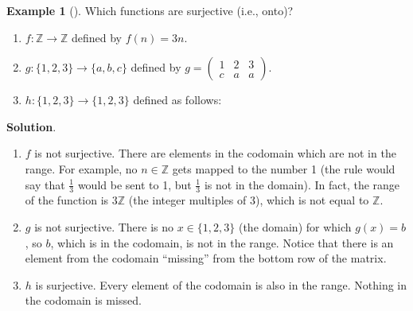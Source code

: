 \documentclass[10pt,]{book}
\theoremstyle{plain}
\theoremstyle{definition}
\theoremstyle{definition}
\newtheorem{example}[theorem]{Example}
\theoremstyle{definition}
\theoremstyle{definition}
\numberwithin{equation}{chapter}
\def\Z{\mathbb Z}
\newcommand{\amp}{&}
\begin{document}
\begin{example}[]\label{example-50}
\hypertarget{p-1633}{}%
Which functions are surjective (i.e., onto)?%
\par
\hypertarget{p-1634}{}%
\leavevmode%
\begin{enumerate}
\item\hypertarget{li-537}{}\(f:\Z \to \Z\) defined by \(f(n) = 3n\).%
\item\hypertarget{li-538}{}\(g: \{1,2,3\} \to \{a,b,c\}\) defined by \(g = \begin{pmatrix}1 \amp 2 \amp 3 \\ c \amp a \amp a \end{pmatrix}\).%
\item\hypertarget{li-539}{}\hypertarget{p-1635}{}%
\(h:\{1,2,3\} \to \{1,2,3\}\) defined as follows:%
\begin{sidebyside}{1}{0.4}{0.4}{0}
\begin{sbspanel}{0.2}
\end{sbspanel}
\end{sidebyside}
\end{enumerate}
%
\par\smallskip%
\noindent\textbf{Solution}.\hypertarget{solution-143}{}\quad%
\hypertarget{p-1636}{}%
\leavevmode%
\begin{enumerate}
\item\hypertarget{li-540}{}\(f\) is not surjective. There are elements in the codomain which are not in the range. For example, no \(n \in \Z\) gets mapped to the number 1 (the rule would say that \(\frac{1}{3}\) would be sent to 1, but \(\frac{1}{3}\) is not in the domain). In fact, the range of the function is \(3\Z\) (the integer multiples of 3), which is not equal to \(\Z\).%
\item\hypertarget{li-541}{}\(g\) is not surjective. There is no \(x \in \{1,2,3\}\) (the domain) for which \(g(x) = b\), so \(b\), which is in the codomain, is not in the range. Notice that there is an element from the codomain ``missing'' from the bottom row of the matrix.%
\item\hypertarget{li-542}{}\(h\) is surjective. Every element of the codomain is also in the range. Nothing in the codomain is missed.%
\end{enumerate}
%
\end{example}
\end{document}
